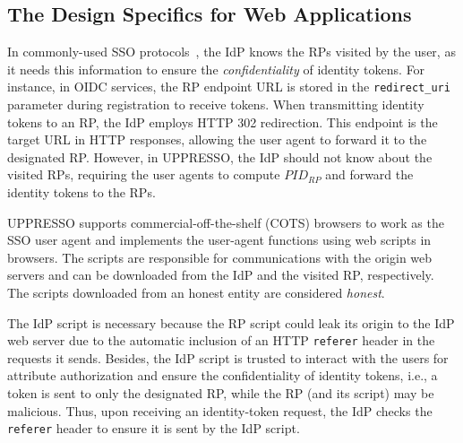\subsection{The Design Specifics for Web Applications}
\label{sec:web-design}

In commonly-used SSO protocols~\cite{OpenIDConnect,rfc6749, SAML, SAMLIdentifier}, the IdP knows the RPs visited by the user, as it needs this information to ensure the \emph{confidentiality} of identity tokens. For instance, in OIDC services, the RP endpoint URL is stored in the \verb+redirect_uri+ parameter \cite{OpenIDConnect} during registration to receive tokens. When transmitting identity tokens to an RP, the IdP employs HTTP 302 redirection. This endpoint is the target URL in HTTP responses, allowing the user agent to forward it to the designated RP. However, in UPPRESSO, the IdP should not know about the visited RPs, requiring the user agents to compute $PID_{RP}$ and forward the identity tokens to the RPs.

UPPRESSO supports commercial-off-the-shelf (COTS) browsers to work as the SSO user agent and implements the user-agent functions using web scripts in browsers. The scripts are responsible for communications with the origin web servers and can be downloaded from the IdP and the visited RP, respectively. The scripts downloaded from an honest entity are considered \emph{honest}. 

The IdP script is necessary because the RP script could leak its origin to the IdP web server due to the automatic inclusion of an HTTP \verb+referer+ header in the requests it sends. Besides, the IdP script is trusted to interact with the users for attribute authorization and ensure the confidentiality of identity tokens, i.e., a token is sent to only the designated RP, while the RP (and its script) may be malicious. Thus, upon receiving an identity-token request, the IdP checks the \verb+referer+ header to ensure it is sent by the IdP script.

